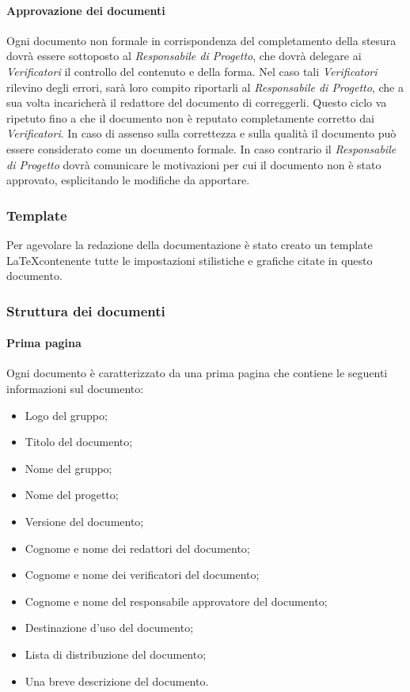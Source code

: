 		\paragraph{Approvazione dei documenti}
		Ogni documento non formale in corrispondenza del completamento della stesura dovrà essere sottoposto al \textit{Responsabile di Progetto}, che dovrà delegare ai \textit{Verificatori} il controllo del contenuto e della forma. Nel caso tali \textit{Verificatori} rilevino degli errori, sarà loro compito riportarli al \textit{Responsabile di Progetto}, che a sua volta incaricherà il redattore del documento di correggerli. Questo ciclo va ripetuto fino a che il documento non è reputato completamente corretto dai  \textit{Verificatori}. In caso di assenso sulla correttezza e sulla qualità il documento può essere considerato come un documento formale. In caso contrario il \textit{Responsabile di Progetto} dovrà comunicare le motivazioni per cui il documento non è stato approvato, esplicitando le modifiche da apportare.
		
	\subsubsection{Template}
	Per agevolare la redazione della documentazione è stato creato un template \LaTeX contenente tutte le impostazioni stilistiche e grafiche citate in questo documento.
	
	\subsubsection{Struttura dei documenti}
	
		\paragraph{Prima pagina}
		Ogni documento è caratterizzato da una prima pagina che contiene le seguenti informazioni sul documento:
		\begin{itemize}
			\item Logo del gruppo;
			\item Titolo del documento;
			\item Nome del gruppo;
			\item Nome del progetto;
			\item Versione del documento;
			\item Cognome e nome dei redattori del documento;
			\item Cognome e nome dei verificatori del documento;
			\item Cognome e nome del responsabile approvatore del documento;
			\item Destinazione d’uso del documento;
			\item Lista di distribuzione del documento;
			\item Una breve descrizione del documento.
		\end{itemize}
	
